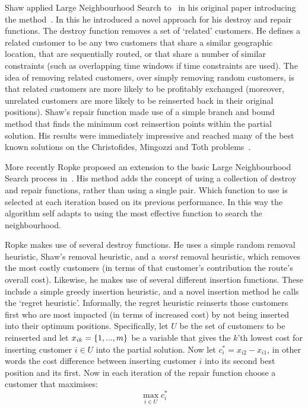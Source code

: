 Shaw applied Large Neighbourhood Search to \VRP\ in his original paper introducing the method~\cite{Shaw:1998}. In this he introduced a novel approach for his destroy and repair functions. The destroy function removes a set of `related' customers. He defines a related customer to be any two customers that share a similar geographic location, that are sequentially routed, or that share a number of similar constraints (such as overlapping time windows if time constraints are used). The idea of removing related customers, over simply removing random customers, is that related customers are more likely to be profitably exchanged (moreover, unrelated customers are more likely to be reinserted back in their original positions). Shaw's repair function made use of a simple branch and bound method that finds the minimum cost reinsertion points within the partial solution. His results were immediately impressive and reached many of the best known solutions on the Christofides, Mingozzi and Toth problems~\cite{CMT:1981}.

More recently Ropke proposed an extension to the basic Large Neighbourhood Search process in~\cite{Ropke:2005}. His method adds the concept of using a collection of destroy and repair functions, rather than using a single pair. Which function to use is selected at each iteration based on its previous performance. In this way the algorithm self adapts to using the most effective function to search the neighbourhood. 

Ropke makes use of several destroy functions. He uses a simple random removal heuristic, Shaw's removal heuristic, and a \emph{worst} removal heuristic, which removes the most costly customers (in terms of that customer's contribution the route's overall cost). Likewise, he makes use of several different insertion functions. These include a simple greedy insertion heuristic, and a novel insertion method he calls the `regret heuristic'. Informally, the regret heuristic reinserts those customers first who are most impacted (in terms of increased cost) by not being inserted into their optimum positions. Specifically, let $U$ be the set of customers to be reinserted and let $x_{ik} = \{1,...,m\}$ be a variable that gives the $k$'th lowest cost for inserting customer $i \in U$ into the partial solution. Now let $c_i^* = x_{i2} - x_{i1}$, in other words the cost difference between inserting customer $i$ into its second best position and its first. Now in each iteration of the repair function choose a customer that maximises:
\[
   \operatorname*{max}_{i \in U} c_i^*
\]

